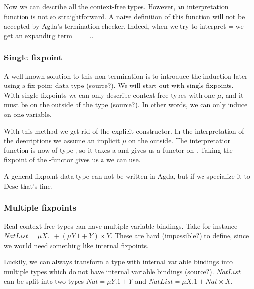 
Now we can describe all the context-free types.
However, an interpretation function  is not so
straightforward.
A naive definition of this function will not be accepted by Agda's
termination checker.
Indeed, when we try to interpret  =   
\AY{(}\AF{\#} \AY{)} we get an expanding term  
 =      = ..

\subsubsection{Single fixpoint}\label{sec:cft-single}

A well known solution to this non-termination is to introduce the
induction later using a fix point data type (source?).
We will start out with single fixpoints.
With single fixpoints we can only describe context free types with one
$μ$, and it must be on the outside of the type (source?).
In other words, we can only induce on one variable.

With this method we get rid of the explicit  constructor.
In the interpretation of the descriptions we assume an implicit $μ$ on
the outside.
The interpretation function  is now of type  
  , so it takes a  and gives us a
functor on .
Taking the fixpoint of the -functor gives us a  we can
use.


\begin{shaded}
  A general fixpoint data type can not be written in Agda, but if we
  specialize it to Desc that's fine.
\end{shaded}

\subsubsection{Multiple fixpoints}

Real context-free types can have multiple variable bindings.
Take for instance $NatList = μX. 1 + (μY. 1 + Y) × Y$.
These are hard (impossible?) to define, since we would need something
like internal fixpoints.

Luckily, we can always transform a type with internal variable
bindings into multiple types which do not have internal variable
bindings (source?).
$NatList$ can be split into two types $Nat = μY. 1 + Y$ and $NatList =
μX. 1 + Nat × X$.

